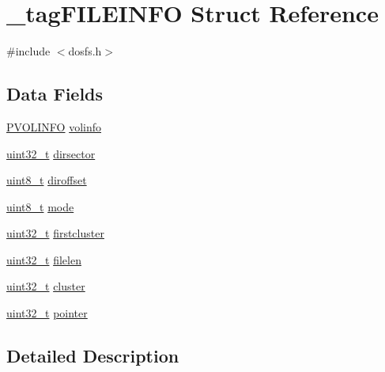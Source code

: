 \hypertarget{struct__tag_f_i_l_e_i_n_f_o}{\section{\-\_\-tag\-F\-I\-L\-E\-I\-N\-F\-O Struct Reference}
\label{struct__tag_f_i_l_e_i_n_f_o}
}


{\ttfamily \#include $<$dosfs.\-h$>$}

\subsection*{Data Fields}
\begin{DoxyCompactItemize}
\item 
\hyperlink{_common_2_libraries_2dosfs_2dosfs_8h_abd4937140ca1b1aa4ccc5db57864cb94}{P\-V\-O\-L\-I\-N\-F\-O} \hyperlink{struct__tag_f_i_l_e_i_n_f_o_ad1df3e8baf126e641d65bd0124d75cc6}{volinfo}
\item 
\hyperlink{stdint_8h_a435d1572bf3f880d55459d9805097f62}{uint32\-\_\-t} \hyperlink{struct__tag_f_i_l_e_i_n_f_o_a1cbbd31889eb0626a1d562f9ba6c1900}{dirsector}
\item 
\hyperlink{stdint_8h_aba7bc1797add20fe3efdf37ced1182c5}{uint8\-\_\-t} \hyperlink{struct__tag_f_i_l_e_i_n_f_o_a8f9f5838873de9b6660388ca21d2c648}{diroffset}
\item 
\hyperlink{stdint_8h_aba7bc1797add20fe3efdf37ced1182c5}{uint8\-\_\-t} \hyperlink{struct__tag_f_i_l_e_i_n_f_o_ad6af17bc51774b936fa7f5aa9d1b60a0}{mode}
\item 
\hyperlink{stdint_8h_a435d1572bf3f880d55459d9805097f62}{uint32\-\_\-t} \hyperlink{struct__tag_f_i_l_e_i_n_f_o_ad26f69c2fee785bf1baf4aded4f3e289}{firstcluster}
\item 
\hyperlink{stdint_8h_a435d1572bf3f880d55459d9805097f62}{uint32\-\_\-t} \hyperlink{struct__tag_f_i_l_e_i_n_f_o_ab62951fccfa808ccf0d5fe5be7f8c4b1}{filelen}
\item 
\hyperlink{stdint_8h_a435d1572bf3f880d55459d9805097f62}{uint32\-\_\-t} \hyperlink{struct__tag_f_i_l_e_i_n_f_o_a5f5528fc511f81d31dbd191f01bd77b9}{cluster}
\item 
\hyperlink{stdint_8h_a435d1572bf3f880d55459d9805097f62}{uint32\-\_\-t} \hyperlink{struct__tag_f_i_l_e_i_n_f_o_ae9852fdaed1583d7a4a317f5938d90df}{pointer}
\end{DoxyCompactItemize}


\subsection{Detailed Description}


